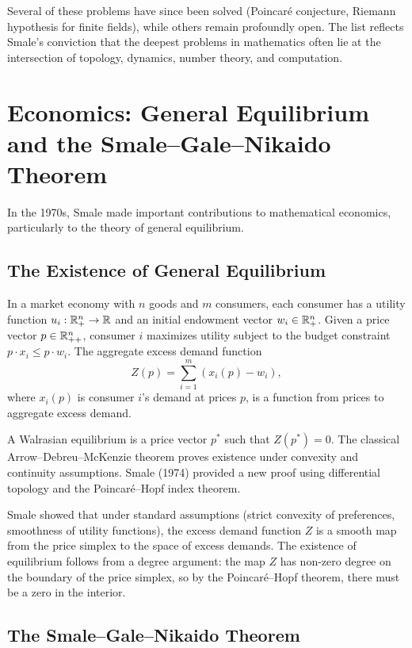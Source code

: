 Several of these problems have since been solved (Poincar\'e conjecture, Riemann hypothesis for finite fields), while others remain profoundly open. The list reflects Smale's conviction that the deepest problems in mathematics often lie at the intersection of topology, dynamics, number theory, and computation.

\section{Economics: General Equilibrium and the Smale--Gale--Nikaido Theorem}

In the 1970s, Smale made important contributions to mathematical economics, particularly to the theory of general equilibrium.

\subsection{The Existence of General Equilibrium}

In a market economy with \(n\) goods and \(m\) consumers, each consumer has a utility function \(u_i: \mathbb{R}^n_+ \to \mathbb{R}\) and an initial endowment vector \(w_i \in \mathbb{R}^n_+\). Given a price vector \(p \in \mathbb{R}^n_{++}\), consumer \(i\) maximizes utility subject to the budget constraint \(p \cdot x_i \leq p \cdot w_i\). The aggregate excess demand function
\[
Z(p) = \sum_{i=1}^m (x_i(p) - w_i),
\]
where \(x_i(p)\) is consumer \(i\)'s demand at prices \(p\), is a function from prices to aggregate excess demand.

A Walrasian equilibrium is a price vector \(p^*\) such that \(Z(p^*) = 0\). The classical Arrow--Debreu--McKenzie theorem proves existence under convexity and continuity assumptions. Smale (1974) provided a new proof using differential topology and the Poincar\'e--Hopf index theorem.

Smale showed that under standard assumptions (strict convexity of preferences, smoothness of utility functions), the excess demand function \(Z\) is a smooth map from the price simplex to the space of excess demands. The existence of equilibrium follows from a degree argument: the map \(Z\) has non-zero degree on the boundary of the price simplex, so by the Poincar\'e--Hopf theorem, there must be a zero in the interior.

\subsection{The Smale--Gale--Nikaido Theorem}

